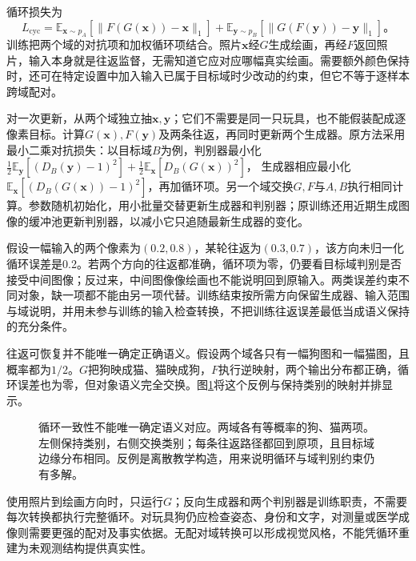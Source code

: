 循环损失为
\begin{equation}
 L_{\mathrm{cyc}}=
 \mathbb{E}_{\bm{x}\sim p_A}
 [\lVert F(G(\bm{x}))-\bm{x}\rVert_1]
 +
 \mathbb{E}_{\bm{y}\sim p_B}
 [\lVert G(F(\bm{y}))-\bm{y}\rVert_1]\text{。}
 \label{eq:vision-cycle-consistency}
\end{equation}
训练把两个域的对抗项和加权循环项结合。照片$\bm{x}$经$G$生成绘画，再经$F$返回照片，输入本身就是往返监督，无需知道它应对应哪幅真实绘画。需要额外颜色保持时，还可在特定设置中加入输入已属于目标域时少改动的约束，但它不等于逐样本跨域配对。

对一次更新，从两个域独立抽$\bm{x},\bm{y}$；它们不需要是同一只玩具，也不能假装配成逐像素目标。计算$G(\bm{x}),F(\bm{y})$及两条往返，再同时更新两个生成器。原方法采用最小二乘对抗损失：以目标域$B$为例，判别器最小化
$\frac12\mathbb{E}_{\bm{y}}[(D_B(\bm{y})-1)^2]+\frac12\mathbb{E}_{\bm{x}}[D_B(G(\bm{x}))^2]$，
生成器相应最小化$\mathbb{E}_{\bm{x}}[(D_B(G(\bm{x}))-1)^2]$，再加循环项。另一个域交换$G,F$与$A,B$执行相同计算。参数随机初始化，用小批量交替更新生成器和判别器；原训练还用近期生成图像的缓冲池更新判别器，以减小它只追随最新生成器的变化。

假设一幅输入的两个像素为$(0.2,0.8)$，某轮往返为$(0.3,0.7)$，该方向未归一化循环误差是0.2。若两个方向的往返都准确，循环项为零，仍要看目标域判别是否接受中间图像；反过来，中间图像像绘画也不能说明回到原输入。两类误差约束不同对象，缺一项都不能由另一项代替。训练结束按所需方向保留生成器、输入范围与域说明，并用未参与训练的输入检查转换，不把训练往返误差最低当成语义保持的充分条件。

往返可恢复并不能唯一确定正确语义。假设两个域各只有一幅狗图和一幅猫图，且概率都为$1/2$。$G$把狗映成猫、猫映成狗，$F$执行逆映射，两个输出分布都正确，循环误差也为零，但对象语义完全交换。图\ref{fig:vision-cycle-ambiguity}将这个反例与保持类别的映射并排显示。

\begin{figure}[htbp]
 \centering
 
 \caption{循环一致性不能唯一确定语义对应。两域各有等概率的狗、猫两项。左侧保持类别，右侧交换类别；每条往返路径都回到原项，且目标域边缘分布相同。反例是离散教学构造，用来说明循环与域判别约束仍有多解。}
 \label{fig:vision-cycle-ambiguity}
\end{figure}

使用照片到绘画方向时，只运行$G$；反向生成器和两个判别器是训练职责，不需要每次转换都执行完整循环。对玩具狗仍应检查姿态、身份和文字，对测量或医学成像则需要更强的配对及事实依据。无配对域转换可以形成视觉风格，不能凭循环重建为未观测结构提供真实性。

